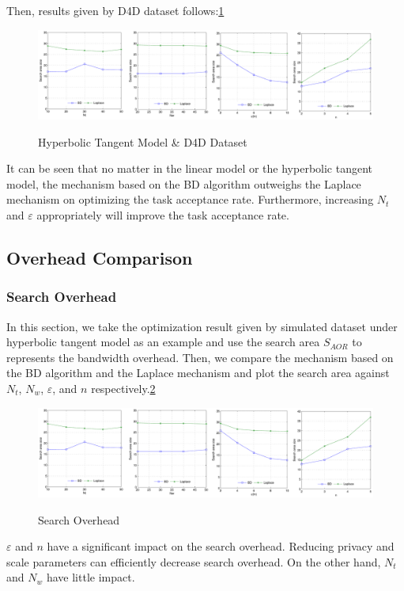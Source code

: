 Then, results given by D4D dataset follows:\ref{img:TanhD4D}

\begin{figure}
\includegraphics[width=1\textwidth]{TanhD4D}
\label{img:TanhD4D}
\caption{Hyperbolic Tangent Model \& D4D Dataset}
\end{figure}

It can be seen that no matter in the linear model or the hyperbolic tangent model, the mechanism based on the BD algorithm outweighs the Laplace mechanism on optimizing the task acceptance rate. Furthermore, increasing $N_t$ and $\varepsilon$ appropriately will improve the task acceptance rate.

\subsection{Overhead Comparison} %
\subsubsection{Search Overhead}
In this section, we take the optimization result given by simulated dataset under hyperbolic tangent model as an example and use the search area $S_{AOR}$ to represents the bandwidth overhead. Then, we compare the mechanism based on the BD algorithm and the Laplace mechanism and plot the search area against $N_t$, $N_w$, $\varepsilon$, and $n$ respectively.\ref{img:SAOR}

\begin{figure}
\includegraphics[width=1\textwidth]{SAOR}
\label{img:SAOR}
\caption{Search Overhead}
\end{figure}

$\varepsilon$ and $n$ have a significant impact on the search overhead. Reducing privacy and scale parameters can efficiently decrease search overhead. On the other hand, $N_t$ and $N_w$ have little impact.

